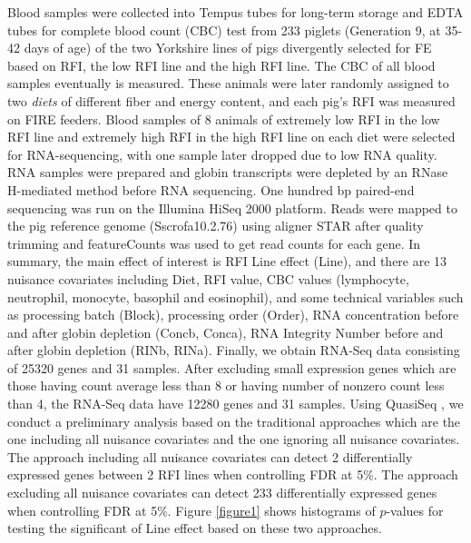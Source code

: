 \documentclass[12pt, letter]{article}\usepackage[]{graphicx}\usepackage[]{color}
\begin{document}
Blood samples were collected into Tempus tubes for long-term storage and EDTA tubes for complete blood count (CBC) test from 233 piglets  (Generation 9, at 35-42 days of age) of the two Yorkshire lines of pigs divergently selected for FE 
based on RFI, the low RFI line and the high RFI line. The CBC of all blood samples eventually is measured. These animals were later randomly assigned to two \emph{diets} of different fiber and energy content, and each pig's RFI was measured on FIRE feeders. Blood samples of 8 animals of extremely low RFI in the low RFI line and extremely high RFI in the high RFI line on each diet were selected for RNA-sequencing, with one sample later dropped due to low RNA quality. RNA samples were prepared and globin transcripts were depleted by an RNase H-mediated method before RNA 
sequencing. One hundred bp paired-end sequencing was run on the Illumina HiSeq 2000 platform. Reads were mapped to the pig reference genome (Sscrofa10.2.76) using aligner STAR after quality trimming and featureCounts was used to get read 
counts for each gene. In summary, the main effect of interest is RFI Line effect (Line), and there are 13 nuisance covariates including Diet, RFI value, 
CBC values (lymphocyte, neutrophil, monocyte, basophil and eosinophil), and some technical variables such as processing batch (Block), processing order (Order), RNA concentration before and after globin depletion (Concb, Conca), RNA Integrity Number before and after globin depletion (RINb, RINa). Finally, we obtain RNA-Seq data consisting of 25320 genes and 31 samples. After excluding small expression genes which are those having count average less than 8 or having number of nonzero count less than 4, the RNA-Seq data have 12280 genes and 31 samples. 
Using QuasiSeq \cite{lundetal2012}, we conduct a preliminary analysis based on the traditional approaches which are the one including all nuisance covariates and the one ignoring all nuisance covariates. The approach including all nuisance covariates can detect 2  differentially expressed genes  between 2 RFI lines when controlling FDR at 5\%.  The approach excluding all nuisance covariates can detect  233 differentially expressed genes when controlling FDR at 5\%. Figure \ref{figure1}  shows histograms of $p$-values for testing the significant of Line effect based on these two approaches. 
\end{document}
